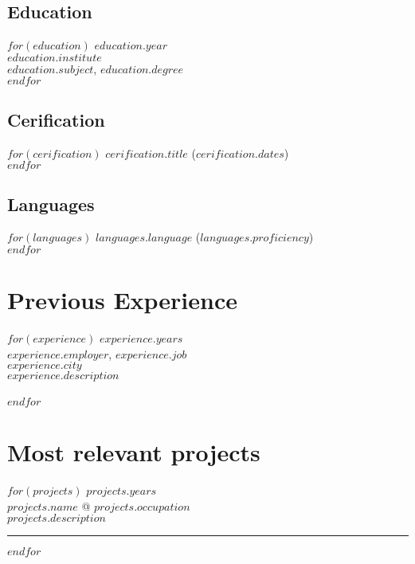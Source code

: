 \documentclass[$fontsize$, a4paper]{article}
\begin{document}
\begin{multicols}{2}

\subsection*{Education}
$for(education)$
\footnotesize{$education.year$}\\
\emph{$education.institute$}\\
\textbf{$education.subject$}, $education.degree$\\
$endfor$

\columnbreak

\subsection*{Cerification}
$for(cerification)$
\href{$cerification.url$}{$cerification.title$} ($cerification.dates$)\\
$endfor$

\vspace{-5pt}

\subsection*{Languages}
$for(languages)$
\emph{$languages.language$} ($languages.proficiency$)\\
$endfor$


\end{multicols}

\vspace{-10pt}



\section*{Previous Experience}
\noindent
$for(experience)$
\footnotesize{$experience.years$}\\
\textsc{$experience.employer$}, \emph{$experience.job$}\\
$experience.city$\\[.2cm]
$experience.description$\\\\
$endfor$

\pagebreak

\section*{Most relevant projects}
\noindent
$for(projects)$
\footnotesize{$projects.years$}\\
\textbf{\textsc{$projects.name$}} @ \emph{$projects.occupation$}\\[.2cm]
$projects.description$

\vspace{5pt}
\noindent\rule[0.5ex]{\linewidth}{1pt}

$endfor$
\end{document}
